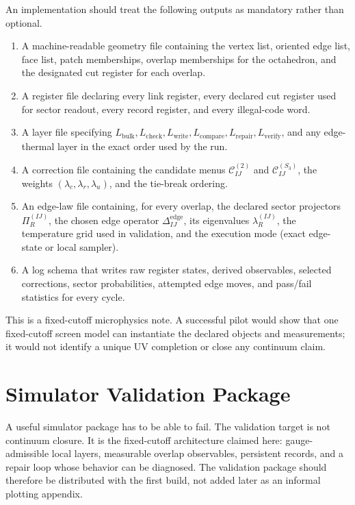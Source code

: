 \documentclass[11pt]{article}
\begin{document}
An implementation should treat the following outputs as mandatory rather than
optional.
\begin{enumerate}[leftmargin=2em]
\item A machine-readable geometry file containing the vertex list, oriented edge list, face list,
patch memberships, overlap memberships for the octahedron, and the designated cut register for
each overlap.
\item A register file declaring every link register, every declared cut register used for sector
readout, every record register, and every illegal-code word.
\item A layer file specifying $L_{\mathrm{bulk}},L_{\mathrm{check}},L_{\mathrm{write}},
L_{\mathrm{compare}},L_{\mathrm{repair}},L_{\mathrm{verify}}$, and any edge-thermal layer in the
exact order used by the run.
\item A correction file containing the candidate menus $\mathcal C_{IJ}^{(2)}$ and
$\mathcal C_{IJ}^{(S_3)}$, the weights $(\lambda_c,\lambda_r,\lambda_u)$, and the tie-break
ordering.
\item An edge-law file containing, for every overlap, the declared sector projectors
$\Pi_R^{(IJ)}$, the chosen edge operator $\Delta_{IJ}^{\mathrm{edge}}$, its eigenvalues
$\lambda_R^{(IJ)}$, the temperature grid used in validation, and the execution mode (exact
edge-state or local sampler).
\item A log schema that writes raw register states, derived observables, selected corrections,
sector probabilities, attempted edge moves, and pass/fail statistics for every cycle.
\end{enumerate}

This is a fixed-cutoff microphysics note. A successful pilot would show that one fixed-cutoff
screen model can instantiate the declared objects and measurements; it would not identify a
unique UV completion or close any continuum claim.

\section{Simulator Validation Package}

A useful simulator package has to be able to fail. The validation target is not
continuum closure. It is the fixed-cutoff architecture claimed here: gauge-admissible
local layers, measurable overlap observables, persistent records, and a repair loop whose
behavior can be diagnosed. The validation package should therefore be distributed with the first
build, not added later as an informal plotting appendix.
\end{document}
